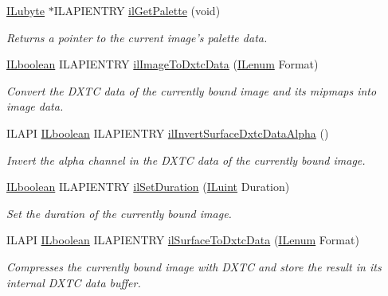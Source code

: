 \begin{DoxyCompactItemize}
\hyperlink{group__il__types_ga057357939bc5a12e8061715453568519}{I\+Lubyte} $\ast$I\+L\+A\+P\+I\+E\+N\+T\+R\+Y \hyperlink{group__data_gaffc60ac194afa1ed9d1bdc266adc5d29}{il\+Get\+Palette} (void)
\begin{DoxyCompactList}\small\item\em Returns a pointer to the current image's palette data. \end{DoxyCompactList}\item 
\hypertarget{group__data_gaa7c7b55455ab5af387502a4cf4ede91f}{\hyperlink{group__il__types_gaa6aa7c95cfdc06b4d8601ef832b7bb0a}{I\+Lboolean} I\+L\+A\+P\+I\+E\+N\+T\+R\+Y \hyperlink{group__data_gaa7c7b55455ab5af387502a4cf4ede91f}{il\+Image\+To\+Dxtc\+Data} (\hyperlink{group__il__types_ga62ca73445716183ef42b1f3906a45ed0}{I\+Lenum} Format)}\label{group__data_gaa7c7b55455ab5af387502a4cf4ede91f}

\begin{DoxyCompactList}\small\item\em Convert the D\+X\+T\+C data of the currently bound image and its mipmaps into image data. \end{DoxyCompactList}\item 
\hypertarget{group__data_ga895ded17dd75715105a64dddb78f9790}{I\+L\+A\+P\+I \hyperlink{group__il__types_gaa6aa7c95cfdc06b4d8601ef832b7bb0a}{I\+Lboolean} I\+L\+A\+P\+I\+E\+N\+T\+R\+Y \hyperlink{group__data_ga895ded17dd75715105a64dddb78f9790}{il\+Invert\+Surface\+Dxtc\+Data\+Alpha} ()}\label{group__data_ga895ded17dd75715105a64dddb78f9790}

\begin{DoxyCompactList}\small\item\em Invert the alpha channel in the D\+X\+T\+C data of the currently bound image. \end{DoxyCompactList}\item 
\hyperlink{group__il__types_gaa6aa7c95cfdc06b4d8601ef832b7bb0a}{I\+Lboolean} I\+L\+A\+P\+I\+E\+N\+T\+R\+Y \hyperlink{group__data_gaf4733214806d616fb5a58662878b880f}{il\+Set\+Duration} (\hyperlink{group__il__types_gaff8e86a1072c8d7cfe387fb87c6ed8e1}{I\+Luint} Duration)
\begin{DoxyCompactList}\small\item\em Set the duration of the currently bound image. \end{DoxyCompactList}\item 
\hypertarget{group__data_ga9fdc29fee3450b319f3a6e3b3f86af8a}{I\+L\+A\+P\+I \hyperlink{group__il__types_gaa6aa7c95cfdc06b4d8601ef832b7bb0a}{I\+Lboolean} I\+L\+A\+P\+I\+E\+N\+T\+R\+Y \hyperlink{group__data_ga9fdc29fee3450b319f3a6e3b3f86af8a}{il\+Surface\+To\+Dxtc\+Data} (\hyperlink{group__il__types_ga62ca73445716183ef42b1f3906a45ed0}{I\+Lenum} Format)}\label{group__data_ga9fdc29fee3450b319f3a6e3b3f86af8a}

\begin{DoxyCompactList}\small\item\em Compresses the currently bound image with D\+X\+T\+C and store the result in its internal D\+X\+T\+C data buffer. \end{DoxyCompactList}\end{DoxyCompactItemize}


